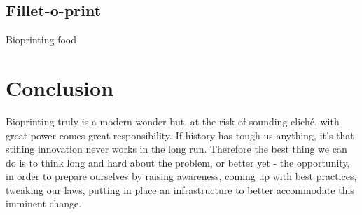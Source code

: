 \documentclass[12pt]{article} %
\begin{document}

\subsection{Fillet-o-print} %
Bioprinting food
\newpage 


\section{Conclusion} %

Bioprinting truly is a modern wonder but, at the risk of sounding cliché, with great power comes great responsibility. If history has tough us anything, it's that stifling innovation never works in the long run. Therefore the best thing we can do is to think long and hard about the problem, or better yet - the opportunity, in order to prepare ourselves by raising awareness, coming up with best practices, tweaking our laws, putting in place an infrastructure to better accommodate this imminent change.

\newpage

\end{document}
